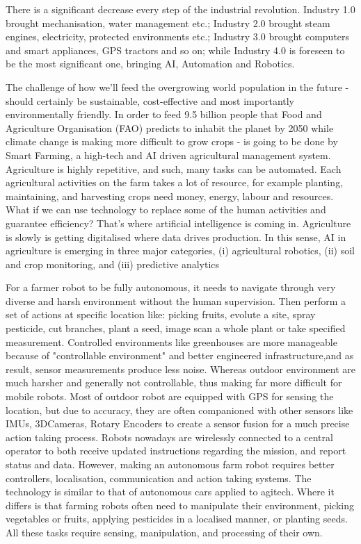 \documentclass[conference]{IEEEtran}
\begin{document}
There is a significant decrease every step of the industrial revolution. Industry 1.0 brought mechanisation, water management etc.; Industry 2.0 brought steam engines, electricity, protected environments etc.; Industry 3.0 brought computers and smart appliances, GPS tractors and so on; while Industry 4.0 is foreseen to be the most significant one, bringing AI, Automation and Robotics.

The challenge of how we'll feed the overgrowing world population in the future - should certainly be sustainable, cost-effective and most importantly environmentally friendly. In order to feed 9.5 billion people that Food and Agriculture Organisation (FAO) predicts to inhabit the planet by 2050 while climate change is making more difficult to grow crops - is going to be done by Smart Farming, a high-tech and AI driven agricultural management system. Agriculture is highly repetitive, and such, many tasks can be automated. Each agricultural activities on the farm takes a lot of resource, for example planting, maintaining, and harvesting crops need money, energy, labour and resources. What if we can use technology to replace some of the human activities and guarantee efficiency? That’s where artificial intelligence is coming in. Agriculture is slowly is getting digitalised where data drives production. In this sense, AI in agriculture is emerging in three major categories, (i) agricultural robotics, (ii) soil and crop monitoring, and (iii) predictive analytics \cite{Giusti_2016}

For a farmer robot to be fully autonomous, it needs to navigate through very diverse and harsh environment without the human supervision. Then perform a set of actions at specific location like: picking fruits, evolute a site, spray pesticide, cut branches, plant a seed, image scan a whole plant or take specified measurement. Controlled environments like greenhouses are more manageable because of "controllable environment" and better engineered infrastructure,and as result, sensor measurements produce less noise. Whereas outdoor environment are much harsher and generally not controllable, thus making far more difficult for mobile robots. Most of outdoor robot are equipped with GPS for sensing the location, but due to accuracy, they are often companioned with other sensors like IMUs, 3DCameras, Rotary Encoders to create a sensor fusion for a much precise action taking process. Robots nowadays are wirelessly connected to a central operator to both receive updated instructions regarding the mission, and report status and data. However, making an autonomous farm robot requires better controllers, localisation, communication and action taking systems. The technology is similar to that of autonomous cars applied to agitech. Where it differs is that farming robots often need to manipulate their environment, picking vegetables or fruits, applying pesticides in a localised manner, or planting seeds. All these tasks require sensing, manipulation, and processing of their own.
\end{document}
